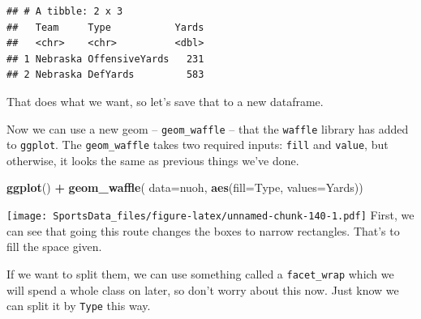 \documentclass[
]{book}
\newenvironment{Shaded}{\begin{snugshade}}{\end{snugshade}}
\newcommand{\DataTypeTok}[1]{\textcolor[rgb]{0.13,0.29,0.53}{#1}}
\newcommand{\KeywordTok}[1]{\textcolor[rgb]{0.13,0.29,0.53}{\textbf{#1}}}
\newcommand{\NormalTok}[1]{#1}
\newcommand{\OperatorTok}[1]{\textcolor[rgb]{0.81,0.36,0.00}{\textbf{#1}}}
\newcommand{\StringTok}[1]{\textcolor[rgb]{0.31,0.60,0.02}{#1}}
\begin{document}
\begin{verbatim}
## # A tibble: 2 x 3
##   Team     Type           Yards
##   <chr>    <chr>          <dbl>
## 1 Nebraska OffensiveYards   231
## 2 Nebraska DefYards         583
\end{verbatim}

That does what we want, so let's save that to a new dataframe.

\begin{Shaded}
\end{Shaded}

Now we can use a new geom -- \texttt{geom\_waffle} -- that the \texttt{waffle} library has added to \texttt{ggplot}. The \texttt{geom\_waffle} takes two required inputs: \texttt{fill} and \texttt{value}, but otherwise, it looks the same as previous things we've done.

\begin{Shaded}
\begin{Highlighting}[]
\KeywordTok{ggplot}\NormalTok{() }\OperatorTok{+}\StringTok{ }\KeywordTok{geom_waffle}\NormalTok{(}
  \DataTypeTok{data=}\NormalTok{nuoh,}
  \KeywordTok{aes}\NormalTok{(}\DataTypeTok{fill=}\NormalTok{Type, }\DataTypeTok{values=}\NormalTok{Yards))}
\end{Highlighting}
\end{Shaded}

\texttt{[image: SportsData\_files/figure-latex/unnamed-chunk-140-1.pdf]}
First, we can see that going this route changes the boxes to narrow rectangles. That's to fill the space given.

If we want to split them, we can use something called a \texttt{facet\_wrap} which we will spend a whole class on later, so don't worry about this now. Just know we can split it by \texttt{Type} this way.
\end{document}

